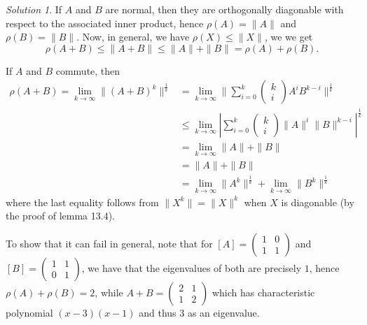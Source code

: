 \documentclass[reqno]{amsart}
\theoremstyle{definition}
\theoremstyle{remark}
\newtheorem*{solution}{Solution}
\begin{document}
    \begin{solution}
        
        If $A$ and $B$ are normal, then
        they are orthogonally diagonable with respect
        to the associated inner product, hence
        $\rho (A) = \|A\|$ and
        $\rho(B) = \|B\|$.
        Now, in general, we have
        $\rho(X) \le \|X\|$, we we get
        \[
        \rho(A+B) \le \|A+B\|
        \le \|A\| + \|B\|
        = \rho(A) + \rho(B).
        \] 


        If $A$ and $B$ commute, then
        \begin{align*}
        \rho(A+B) = 
        \lim_{k\to \infty}
        \|\left( A+B \right)^{k}\|^{\frac{1}{k}}
        &=
        \lim_{k\to \infty}
        \| \sum_{i=0}^{k} \begin{pmatrix} k\\i \end{pmatrix} 
        A^{i} B^{k-i} \|^{\frac{1}{k}}\\
        &\le \lim_{k\to \infty}
        \left| \sum_{i=0}^{k} 
        \begin{pmatrix} k\\i \end{pmatrix} 
        \|A\|^{i} \|B\|^{k-i} \right|^{\frac{1}{k}}\\
        &= \lim_{k\to \infty} 
         \|A\|+\|B\|\\
        &= \|A\| + \|B\|\\
        &= \lim_{k\to \infty} \|A^{k}\|^{\frac{1}{k}} +
        \lim_{k\to \infty} \|B^{k}\|^{\frac{1}{k}}
        \end{align*}
        where the last equality follows from
        $\|X^{k}\| = \|X\|^{k}$ when $X$ is diagonable (by
        the proof of lemma 13.4).




        To show that it can fail in general, note that
        for $\left[ A \right] =
        \begin{pmatrix} 1 & 0 \\ 1 & 1\end{pmatrix} $ and
        $\left[ B \right] =
        \begin{pmatrix} 1 & 1\\
        0 & 1\end{pmatrix} $, we have
        that the eigenvalues of both are precisely
        $1$, hence $\rho(A) + \rho(B) = 2$, while
            $A+B = \begin{pmatrix} 2 & 1\\
            1 & 2\end{pmatrix} $ which has characteristic
            polynomial
            $(x-3)(x-1)$ and thus
             $3$ as an eigenvalue.
    \end{solution}
\end{document}
